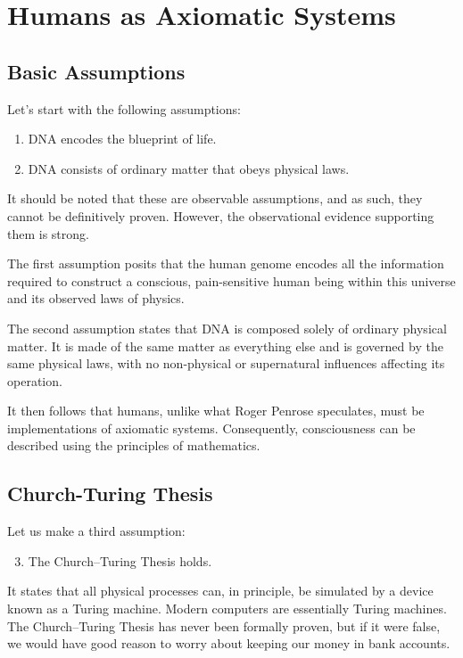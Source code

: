 \chapter{Humans as Axiomatic Systems}
\label{chap:humans-as-axiomatic-systems}

\section{Basic Assumptions}

Let's start with the following assumptions:

\begin{enumerate}
    \item DNA encodes the blueprint of life.
    \item DNA consists of ordinary matter that obeys physical laws.
\end{enumerate}

It should be noted that these are observable assumptions, and as such, they cannot be definitively proven. However, the observational evidence supporting them is strong.

The first assumption posits that the human genome encodes all the information required to construct a conscious, pain-sensitive human being within this universe and its observed laws of physics.

The second assumption states that DNA is composed solely of ordinary physical matter. It is made of the same matter as everything else and is governed by the same physical laws, with no non-physical or supernatural influences affecting its operation.

It then follows that humans, unlike what Roger Penrose speculates, must be implementations of axiomatic systems. Consequently, consciousness can be described using the principles of mathematics.


\section{Church-Turing Thesis}

Let us make a third assumption:

\begin{enumerate}
    \setcounter{enumi}{2}
    \item The Church--Turing Thesis holds.
\end{enumerate}

It states that all physical processes can, in principle, be simulated by a device known as a Turing machine. Modern computers are essentially Turing machines. The Church--Turing Thesis has never been formally proven, but if it were false, we would have good reason to worry about keeping our money in bank accounts.


